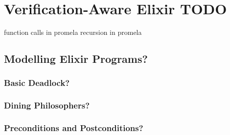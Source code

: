 \chapter{Verification-Aware Elixir TODO}
function calls in promela
recursion in promela
\section{Modelling Elixir Programs?}
\subsection{Basic Deadlock?}
\subsection{Dining Philosophers?}
\subsection{Preconditions and Postconditions?}